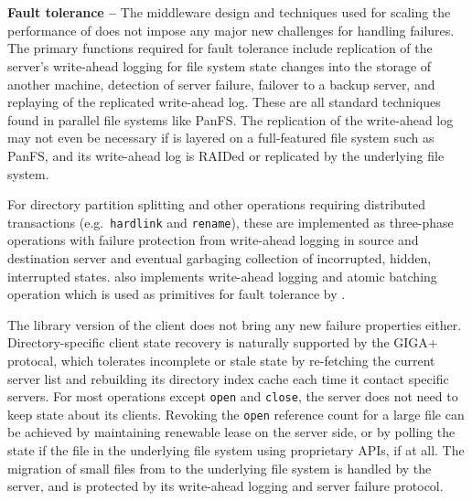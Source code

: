 ~\\
~\\
\textbf{Fault tolerance -- }
The middleware design and techniques used for scaling the performance
of \sys does not impose any major new challenges for handling failures.
The primary functions required for fault tolerance include
replication of the \sys server's write-ahead logging for file system
state changes into the storage of another machine,
detection of server failure, failover to a backup server,
and replaying of the replicated write-ahead log.
These are all standard techniques found in parallel file systems like PanFS.
The replication of the write-ahead log may not even be necessary
if \sys is layered on a full-featured file system such as PanFS,
and its write-ahead log is RAIDed or replicated by the underlying file system.

For directory partition splitting and other operations requiring
distributed transactions (e.g.\texttt{ hardlink} and \texttt{rename}),
these are implemented as three-phase operations with failure protection
from write-ahead logging in source and destination server
and eventual garbaging collection of incorrupted, hidden, interrupted states.
\ldb also implements write-ahead logging and atomic batching operation
which is used as primitives for fault tolerance by \tfs.

The library version of the \sys client does not bring any new failure properties
either.
Directory-specific client state recovery is naturally supported by the GIGA+
protocal, which tolerates incomplete or stale state by
re-fetching the current server list and
rebuilding its directory index cache each time it contact specific servers.
For most operations except \texttt{open} and \texttt{close},
the \sys server does not need to keep state about its clients.
Revoking the \texttt{open} reference count for a large file can be achieved by
maintaining renewable lease on the server side,
or by polling the state if the file in the underlying file system
using proprietary APIs, if at all.
The migration of small files from \tfs to the underlying file system is
handled by the \sys server, and is protected by its write-ahead logging
and server failure protocol.
